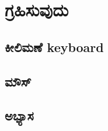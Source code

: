 \chapter{ಗ್ರಹಿಸುವುದು} 
\SampleProgram
\section{ಕೀಲಿಮಣೆ \textenglish{keyboard}}

\section{ ಮೌಸ್} 

\section{ಅಭ್ಯಾಸ }